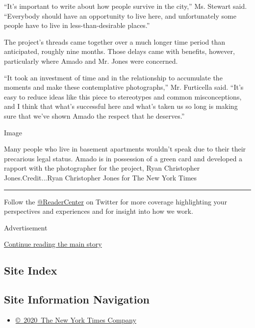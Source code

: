 ``It's important to write about how people survive in the city,'' Ms.
Stewart said. ``Everybody should have an opportunity to live here, and
unfortunately some people have to live in less-than-desirable places.''

The project's threads came together over a much longer time period than
anticipated, roughly nine months. Those delays came with benefits,
however, particularly where Amado and Mr. Jones were concerned.

``It took an investment of time and in the relationship to accumulate
the moments and make these contemplative photographs,'' Mr. Furticella
said. ``It's easy to reduce ideas like this piece to stereotypes and
common misconceptions, and I think that what's successful here and
what's taken us so long is making sure that we've shown Amado the
respect that he deserves.''

Image

Many people who live in basement apartments wouldn't speak due to their
their precarious legal status. Amado is in possession of a green card
and developed a rapport with the photographer for the project, Ryan
Christopher Jones.Credit...Ryan Christopher Jones for The New York Times

\begin{center}\rule{0.5\linewidth}{\linethickness}\end{center}

Follow the \href{https://twitter.com/readercenter}{@ReaderCenter} on
Twitter for more coverage highlighting your perspectives and experiences
and for insight into how we work.

Advertisement

\protect\hyperlink{after-bottom}{Continue reading the main story}

\hypertarget{site-index}{%
\subsection{Site Index}\label{site-index}}

\hypertarget{site-information-navigation}{%
\subsection{Site Information
Navigation}\label{site-information-navigation}}

\begin{itemize}
\tightlist
\item
  \href{https://help.nytimes3xbfgragh.onion/hc/en-us/articles/115014792127-Copyright-notice}{©~2020~The
  New York Times Company}
\end{itemize}

